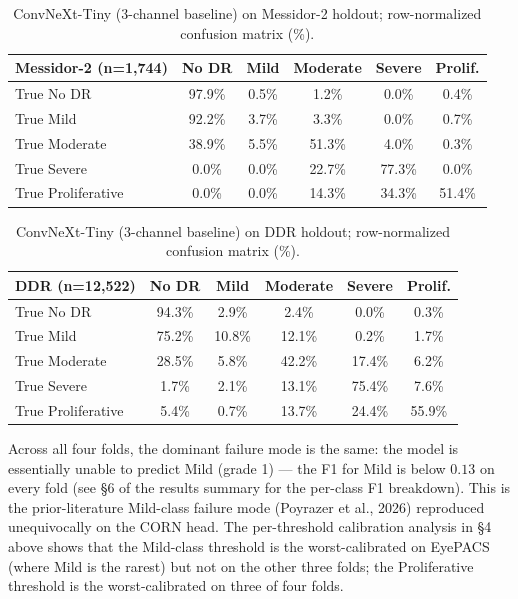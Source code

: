 \documentclass[11pt]{article}
\begin{document}
\begin{table}[ht]
\centering
\small
\begin{tabular}{lccccc}
\toprule
Messidor-2 (n=1{,}744)      & No DR    & Mild     & Moderate & Severe   & Prolif. \\
\midrule
True No DR                  & 97.9\%   & 0.5\%    & 1.2\%    & 0.0\%    & 0.4\%   \\
True Mild                   & 92.2\%   & 3.7\%    & 3.3\%    & 0.0\%    & 0.7\%   \\
True Moderate               & 38.9\%   & 5.5\%    & 51.3\%   & 4.0\%    & 0.3\%   \\
True Severe                 & 0.0\%    & 0.0\%    & 22.7\%   & 77.3\%   & 0.0\%   \\
True Proliferative          & 0.0\%    & 0.0\%    & 14.3\%   & 34.3\%   & 51.4\%  \\
\bottomrule
\end{tabular}
\caption{ConvNeXt-Tiny (3-channel baseline) on Messidor-2 holdout; row-normalized confusion matrix (\%).}
\label{tab:cm-messidor}
\end{table}

\begin{table}[ht]
\centering
\small
\begin{tabular}{lccccc}
\toprule
DDR (n=12{,}522)            & No DR    & Mild     & Moderate & Severe   & Prolif. \\
\midrule
True No DR                  & 94.3\%   & 2.9\%    & 2.4\%    & 0.0\%    & 0.3\%   \\
True Mild                   & 75.2\%   & 10.8\%   & 12.1\%   & 0.2\%    & 1.7\%   \\
True Moderate               & 28.5\%   & 5.8\%    & 42.2\%   & 17.4\%   & 6.2\%   \\
True Severe                 & 1.7\%    & 2.1\%    & 13.1\%   & 75.4\%   & 7.6\%   \\
True Proliferative          & 5.4\%    & 0.7\%    & 13.7\%   & 24.4\%   & 55.9\%  \\
\bottomrule
\end{tabular}
\caption{ConvNeXt-Tiny (3-channel baseline) on DDR holdout; row-normalized confusion matrix (\%).}
\label{tab:cm-ddr}
\end{table}

Across all four folds, the dominant failure mode is the same: the model is essentially unable to predict Mild (grade 1) --- the F1 for Mild is below $0.13$ on every fold (see \S6 of the results summary for the per-class F1 breakdown). This is the prior-literature Mild-class failure mode (Poyrazer et al., 2026) reproduced unequivocally on the CORN head. The per-threshold calibration analysis in \S4 above shows that the Mild-class threshold is the worst-calibrated on EyePACS (where Mild is the rarest) but not on the other three folds; the Proliferative threshold is the worst-calibrated on three of four folds.
\end{document}
